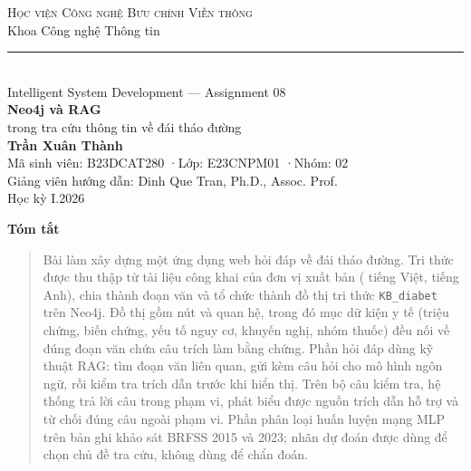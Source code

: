 \documentclass[11pt,a4paper]{article}
\begin{document}
\thispagestyle{empty}
\begin{center}
  \vspace*{1.2cm}
  {\large\scshape Học viện Công nghệ Bưu chính Viễn thông}\\[4pt]
  {\normalsize Khoa Công nghệ Thông tin}\\[10pt]
  \rule{0.35\linewidth}{0.4pt}\\[16pt]

  {\normalsize Intelligent System Development — Assignment 08}\\[26pt]

  {\Huge\bfseries Neo4j và RAG}\\[10pt]
  {\large trong tra cứu thông tin về đái tháo đường}\\[36pt]

  {\large\bfseries Trần Xuân Thành}\\[6pt]
  {\small Mã sinh viên: B23DCAT280 \quad·\quad Lớp: E23CNPM01 \quad·\quad Nhóm: 02}\\[4pt]
  {\small Giảng viên hướng dẫn: Dinh Que Tran, Ph.D., Assoc. Prof.}\\[24pt]

  {\small Học kỳ I.2026}
\end{center}

\vspace{0.8cm}
\begin{center}\bfseries Tóm tắt\end{center}
\begin{quote}\small
Bài làm xây dựng một ứng dụng web hỏi đáp về đái tháo đường. Tri thức được thu thập từ
\nDocs{} tài liệu công khai của \nPublishers{} đơn vị xuất bản (\nDocsVi{} tiếng Việt, \nDocsEn{} tiếng Anh),
chia thành \nChunks{} đoạn văn và tổ chức thành đồ thị tri thức \texttt{KB\_diabet} trên Neo4j.
Đồ thị gồm \nNodes{} nút và \nRels{} quan hệ, trong đó \nFacts{} mục dữ kiện y tế (triệu chứng, biến chứng,
yếu tố nguy cơ, khuyến nghị, nhóm thuốc) đều nối về đúng đoạn văn chứa câu trích làm bằng chứng.
Phần hỏi đáp dùng kỹ thuật RAG: tìm đoạn văn liên quan, gửi kèm câu hỏi cho mô hình ngôn ngữ, rồi kiểm tra
trích dẫn trước khi hiển thị. Trên bộ \nQuestions{} câu kiểm tra, hệ thống trả lời \answeredTwo{} câu trong phạm vi,
\supportedTwo{} phát biểu được nguồn trích dẫn hỗ trợ và từ chối đúng  câu ngoài phạm vi.
Phần phân loại huấn luyện mạng MLP trên \nRowsStatus{} bản ghi khảo sát BRFSS 2015 và 2023;
nhãn dự đoán được dùng để chọn chủ đề tra cứu, không dùng để chẩn đoán.
\end{quote}
\end{document}
